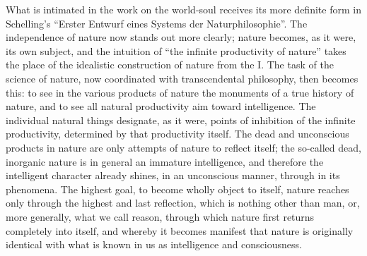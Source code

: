 What is intimated in the work on the world-soul receives its more
definite form in Schelling's ``Erster Entwurf eines Systems der
Naturphilosophie''. The independence of nature now stands out more
clearly; nature becomes, as it were, its own subject, and the intuition
of ``the infinite productivity of nature'' takes the place of the
idealistic construction of nature from the I. The task of the science of
nature, now coordinated with transcendental philosophy, then becomes
this: to see in the various products of nature the monuments of a true
history of nature, and to see all natural productivity aim toward
intelligence. The individual natural things designate, as it were,
points of inhibition of the infinite productivity, determined by that
productivity itself. The dead and unconscious products in nature are only
attempts of nature to reflect itself; the so-called dead, inorganic
nature is in general an immature intelligence, and therefore the
intelligent character already shines, in an unconscious manner,
through in its phenomena. The highest goal, to become wholly
object to itself, nature reaches only through the highest and last
reflection, which is nothing other than man, or, more generally, what we
call reason, through which nature first returns completely into itself,
and whereby it becomes manifest that nature is originally identical with
what is known in us as intelligence and consciousness.

